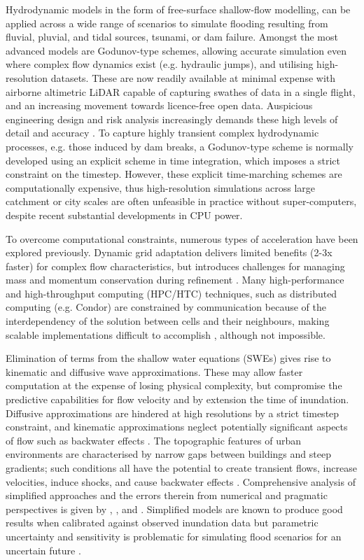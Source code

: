 Hydrodynamic models in the form of free-surface shallow-flow modelling, can be applied across a wide range of scenarios to simulate flooding resulting from fluvial, pluvial, and tidal sources, tsunami, or dam failure. Amongst the most advanced models are Godunov-type schemes, allowing accurate simulation even where complex flow dynamics exist (e.g. hydraulic jumps), and utilising high-resolution datasets. These are now readily available at minimal expense with airborne altimetric LiDAR capable of capturing swathes of data in a single flight, and an increasing movement towards licence-free open data. Auspicious engineering design and risk analysis increasingly demands these high levels of detail and accuracy \citep{French2003,Haile2005,Marks2000}. To capture highly transient complex hydrodynamic processes, e.g. those induced by dam breaks, a Godunov-type scheme is normally developed using an explicit scheme in time integration, which imposes a strict constraint on the timestep. However, these explicit time-marching schemes are computationally expensive, thus high-resolution simulations across large catchment or city scales are often unfeasible in practice without super-computers, despite recent substantial developments in CPU power.

To overcome computational constraints, numerous types of acceleration have been explored previously. Dynamic grid adaptation delivers limited benefits (2-3x faster) for complex flow characteristics, but introduces challenges for managing mass and momentum conservation during refinement \citep{Liang2004}. Many high-performance and high-throughput computing (HPC/HTC) techniques, such as distributed computing (e.g. Condor) are constrained by communication because of the interdependency of the solution between cells and their neighbours, making scalable implementations difficult to accomplish \citep{Pau2006,Delis2009}, although not impossible.

Elimination of terms from the shallow water equations (SWEs) gives rise to kinematic and diffusive wave approximations. These may allow faster computation at the expense of losing physical complexity, but compromise the predictive capabilities for flow velocity and by extension the time of inundation. Diffusive approximations are hindered at high resolutions by a strict timestep constraint, and kinematic approximations neglect potentially significant aspects of flow such as backwater effects \citep{Bates2000,Tsai2003,Hunter2005}. The topographic features of urban environments are characterised by narrow gaps between buildings and steep gradients; such conditions all have the potential to create transient flows, increase velocities, induce shocks, and cause backwater effects \citep{Testa2007,ElKadiAbderrezzak2011,Xia2011}. Comprehensive analysis of simplified approaches and the errors therein from numerical and pragmatic perspectives is given by \citet{Singh1996}, \citet{Hunter2007}, and \citet{Pender2010,Pender2013}. Simplified models are known to produce good results when calibrated against observed inundation data \citep[e.g.][]{Neal2009,Horritt2010} but parametric uncertainty and sensitivity is problematic for simulating flood scenarios for an uncertain future \citep{Horritt2002,Yu2006,Fewtrell2008a}.

